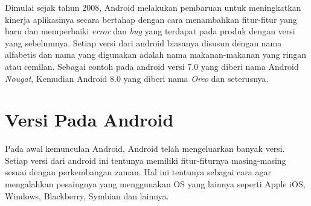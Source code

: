 Dimulai sejak tahun 2008, Android melakukan pembaruan untuk meningkatkan kinerja aplikasinya secara bertahap dengan cara menambahkan fitur-fitur yang baru dan memperbaiki \textit{error} dan \textit{bug} yang terdapat pada produk dengan versi yang sebelumnya. Setiap versi dari android biasanya disusun dengan nama alfabetis dan nama yang digunakan adalah nama makanan-makanan yang ringan atau cemilan. Sebagai contoh pada android versi 7.0 yang diberi nama Android \textit{Nougat}, Kemudian Android 8.0 yang diberi nama \textit{Oreo} dan seterusnya. 

\section{Versi Pada Android}
Pada awal kemunculan Android, Android telah mengeluarkan banyak versi. Setiap versi dari android ini tentunya memiliki fitur-fiturnya masing-masing sesuai dengan perkembangan zaman. Hal ini tentunya sebagai cara agar mengalahkan pesaingnya yang menggunakan OS yang lainnya seperti Apple iOS, Windows, Blackberry, Symbian dan lainnya. 
